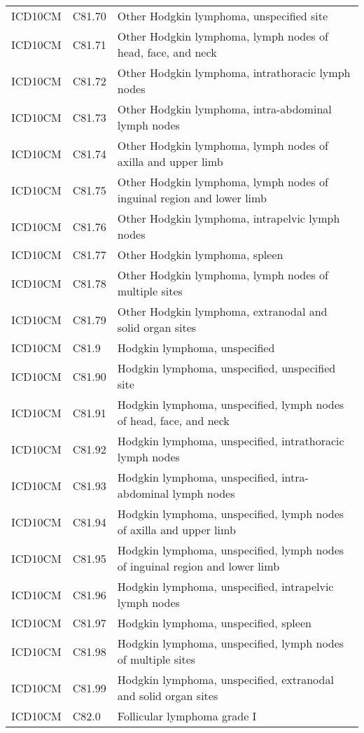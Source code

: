 \begin{table}[ht]
\begin{tabular}{lll}
  ICD10CM & C81.70 & Other Hodgkin lymphoma, unspecified site \\ 
  ICD10CM & C81.71 & Other Hodgkin lymphoma, lymph nodes of head, face, and neck \\ 
  ICD10CM & C81.72 & Other Hodgkin lymphoma, intrathoracic lymph nodes \\ 
  ICD10CM & C81.73 & Other Hodgkin lymphoma, intra-abdominal lymph nodes \\ 
  ICD10CM & C81.74 & Other Hodgkin lymphoma, lymph nodes of axilla and upper limb \\ 
  ICD10CM & C81.75 & Other Hodgkin lymphoma, lymph nodes of inguinal region and lower limb \\ 
  ICD10CM & C81.76 & Other Hodgkin lymphoma, intrapelvic lymph nodes \\ 
  ICD10CM & C81.77 & Other Hodgkin lymphoma, spleen \\ 
  ICD10CM & C81.78 & Other Hodgkin lymphoma, lymph nodes of multiple sites \\ 
  ICD10CM & C81.79 & Other Hodgkin lymphoma, extranodal and solid organ sites \\ 
  ICD10CM & C81.9 & Hodgkin lymphoma, unspecified \\ 
  ICD10CM & C81.90 & Hodgkin lymphoma, unspecified, unspecified site \\ 
  ICD10CM & C81.91 & Hodgkin lymphoma, unspecified, lymph nodes of head, face, and neck \\ 
  ICD10CM & C81.92 & Hodgkin lymphoma, unspecified, intrathoracic lymph nodes \\ 
  ICD10CM & C81.93 & Hodgkin lymphoma, unspecified, intra-abdominal lymph nodes \\ 
  ICD10CM & C81.94 & Hodgkin lymphoma, unspecified, lymph nodes of axilla and upper limb \\ 
  ICD10CM & C81.95 & Hodgkin lymphoma, unspecified, lymph nodes of inguinal region and lower limb \\ 
  ICD10CM & C81.96 & Hodgkin lymphoma, unspecified, intrapelvic lymph nodes \\ 
  ICD10CM & C81.97 & Hodgkin lymphoma, unspecified, spleen \\ 
  ICD10CM & C81.98 & Hodgkin lymphoma, unspecified, lymph nodes of multiple sites \\ 
  ICD10CM & C81.99 & Hodgkin lymphoma, unspecified, extranodal and solid organ sites \\ 
  ICD10CM & C82.0 & Follicular lymphoma grade I \\ 

\end{tabular}
\end{table}
